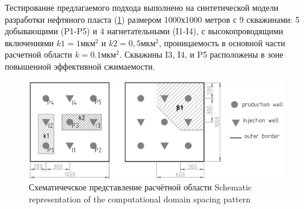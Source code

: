 \documentclass{article}
\begin{document}



Тестирование предлагаемого подхода выполнено на синтетической модели разработки нефтяного пласта (\ref{fig:schime}) размером 1000х1000 метров с 9 скважинами: 5 добывающими (P1-P5) и 4 нагнетательными (I1-I4), с высокопроводящими включениями $k1 = 1 мкм^2$ и $k2 = 0,5 мкм^2$, проницаемость в основной части расчетной области $k = 0.1 мкм^2$. Скважины I3, I4, и P5 расположены в зоне повышенной эффективной сжимаемости. 

\begin{figure}
	\centering
	\includegraphics[width=0.7\linewidth]{fig1}
	\caption{Схематичечское представление расчётной области Schematic representation of the computational domain spacing pattern}
	\label{fig:schime}
\end{figure}
\end{document}
